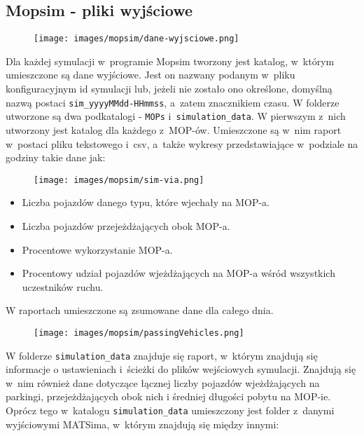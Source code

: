 \subsection{Mopsim - pliki wyjściowe}
    \begin{figure}[h]
        \centering
        \texttt{[image: images/mopsim/dane-wyjsciowe.png]}
    \end{figure}
Dla każdej symulacji w~programie Mopsim tworzony jest katalog, w~którym umieszczone są dane wyjściowe. Jest on nazwany podanym w~pliku konfiguracyjnym id symulacji lub, jeżeli nie zostało ono określone, domyślną nazwą postaci \texttt{sim\_yyyyMMdd-HHmmss}, a~zatem znacznikiem czasu. W folderze utworzone są dwa podkatalogi - \texttt{MOPs} i~\texttt{simulation\_data}. W pierwszym z~nich utworzony jest katalog dla każdego z~MOP-ów. Umieszczone są w~nim raport w~postaci pliku tekstowego i~csv, a~także wykresy przedstawiające w~podziale na godziny takie dane jak:
    \begin{figure}[!b]
        \centering
        \texttt{[image: images/mopsim/sim-via.png]}
    \end{figure}
\begin{itemize}
\item Liczba pojazdów danego typu, które wjechały na MOP-a.
\item Liczba pojazdów przejeżdżających obok MOP-a.
\item Procentowe wykorzystanie MOP-a.
\item Procentowy udział pojazdów wjeżdżających na MOP-a wśród wszystkich uczestników ruchu.
\end{itemize}
W raportach umieszczone są zsumowane dane dla całego dnia.
    \begin{figure}[h]
        \centering
        \texttt{[image: images/mopsim/passingVehicles.png]}
    \end{figure}
W folderze \texttt{simulation\_data} znajduje się raport, w~którym znajdują się informacje o ustawieniach i~ścieżki do plików wejściowych symulacji. Znajdują się w~nim również dane dotyczące łącznej liczby pojazdów wjeżdżających na parkingi, przejeżdżających obok nich i
średniej długości pobytu na MOP-ie. Oprócz tego w~katalogu \texttt{simulation\_data} umieszczony jest folder z~danymi wyjściowymi MATSima, w~którym znajdują się między innymi:

